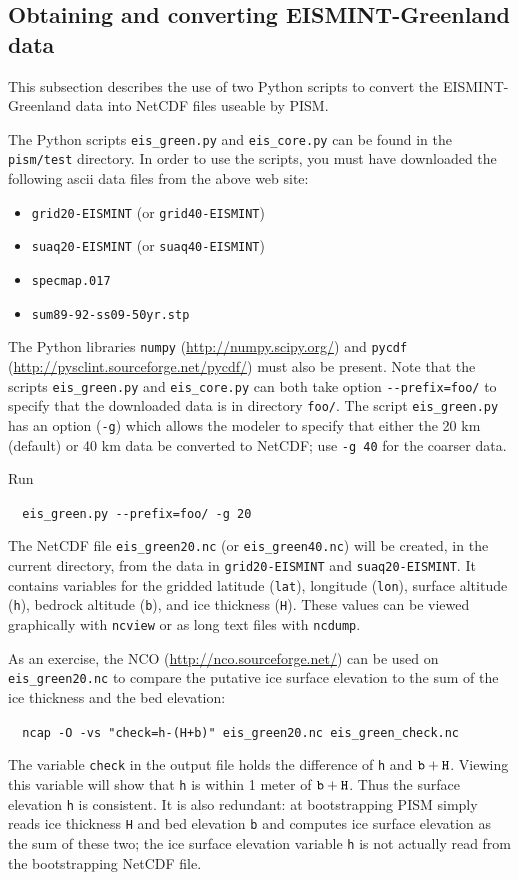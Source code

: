 \documentclass[11pt,final]{amsart}
\begin{document}
\subsection{Obtaining and converting EISMINT-Greenland data}  This subsection describes the use of two Python scripts to convert the EISMINT-Greenland data into NetCDF files useable by PISM.

The Python scripts \verb|eis_green.py| and \verb|eis_core.py| can be found in the \verb|pism/test| directory.  In order to use the scripts, you must have downloaded the following ascii data files from the above web site:\begin{itemize}
 \item \verb|grid20-EISMINT| (or \verb|grid40-EISMINT|)
 \item \verb|suaq20-EISMINT| (or \verb|suaq40-EISMINT|)
 \item \verb|specmap.017|
 \item \verb|sum89-92-ss09-50yr.stp|
\end{itemize}
The Python libraries \verb|numpy| (\url{http://numpy.scipy.org/}) and \verb|pycdf| (\url{http://pysclint.sourceforge.net/pycdf/}) must also be present.  Note that the scripts \verb|eis_green.py| and \verb|eis_core.py| can both take option \verb|--prefix=foo/| to specify that the downloaded data is in directory \verb|foo/|.  The script \verb|eis_green.py| has an option (\verb|-g|) which allows the modeler to specify that either the 20 km (default) or 40 km data be converted to NetCDF; use \verb|-g 40| for the coarser data.

Run

\verb|  eis_green.py --prefix=foo/ -g 20|

The NetCDF file \verb|eis_green20.nc| (or \verb|eis_green40.nc|) will be created, in the current directory, from the data in \verb|grid20-EISMINT| and \verb|suaq20-EISMINT|.  It contains variables for the gridded latitude (\verb|lat|), longitude (\verb|lon|), surface altitude (\verb|h|), bedrock altitude (\verb|b|), and ice thickness (\verb|H|).  These values can be viewed graphically with \verb|ncview| or as long text files with \verb|ncdump|.

As an exercise, the NCO (\url{http://nco.sourceforge.net/}) can be used on \verb|eis_green20.nc| to compare the putative ice surface elevation to the sum of the ice thickness and the bed elevation:

\verb|  ncap -O -vs "check=h-(H+b)" eis_green20.nc eis_green_check.nc|

\noindent The variable \verb|check| in the output file holds the difference of \verb|h| and $\verb|b|+\verb|H|$.  Viewing this variable will show that \verb|h| is within 1 meter of $\verb|b|+\verb|H|$.  Thus the surface elevation \verb|h| is consistent.  It is also redundant: at bootstrapping PISM simply reads ice thickness \verb|H| and bed elevation \verb|b| and computes ice surface elevation as the sum of these two; the ice surface elevation variable \verb|h| is not actually read from the bootstrapping NetCDF file.
\end{document}
